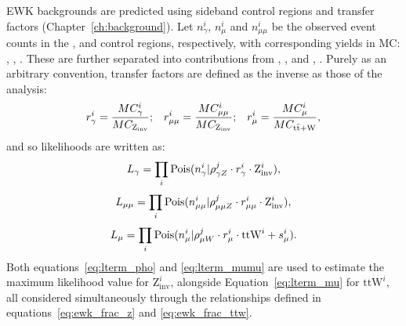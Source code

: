 EWK backgrounds are predicted using sideband control regions and transfer 
factors (Chapter~\ref{ch:background}). Let $n_{\gamma}^i$, $n_{\mu}^i$ and
$n_{\mu\mu}^i$ be
the observed event counts in the \gj, \mj and \mmj control regions, 
respectively, with corresponding yields in MC: \mcp, \mcm, \mcmm. These are
further separated into contributions from \zinv, \mczinv, and ,
\mcttw. Purely as an arbitrary convention, transfer factors are defined as
the inverse as those of the analysis:
% 
\begin{equation}
r_{\gamma}^i = \frac{MC_{\gamma}^i}{MC_{\text{Z}_{\text{inv}}}};\;\;\;
r_{\mu\mu}^i = \frac{MC_{\mu\mu}^i}{MC_{\text{Z}_{\text{inv}}}};\;\;\;
r_{\mu}^i = \frac{MC_{\mu}^i}{MC_{\rm{t}\bar{\rm{t}}+\text{W}}},
\end{equation}
% 
and so likelihoods are written as:
% 
\begin{equation}
L_{\gamma} = \prod_i \text{Pois}(n_{\gamma}^i | \rho^j_{\gamma Z} \cdot r^i_{\gamma} \cdot \text{Z}^i_{\text{inv}}),
\label{eq:lterm_pho}
\end{equation}
\begin{equation}
L_{\mu\mu} = \prod_i \text{Pois}(n_{\mu\mu}^i | \rho^j_{\mu\mu Z} \cdot r^i_{\mu\mu} \cdot \text{Z}^i_{\text{inv}}),
\label{eq:lterm_mumu}
\end{equation}
\begin{equation}
L_{\mu} = \prod_i \text{Pois}(n_{\mu}^i | \rho^j_{\mu W} \cdot r^i_{\mu} \cdot \text{ttW}^i + s_{\mu}^i).
\label{eq:lterm_mu}
\end{equation}
% 
Both equations~\ref{eq:lterm_pho} and \ref{eq:lterm_mumu} are used to estimate the 
maximum likelihood value for $\text{Z}^i_{\text{inv}}$, alongside Equation~\ref{eq:lterm_mu} 
for $\text{ttW}^i$, all considered simultaneously through the relationships defined in
equations~\ref{eq:ewk_frac_z} and \ref{eq:ewk_frac_ttw}.

